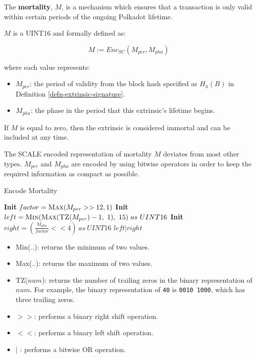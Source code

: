 \begin{definition}
    \label{defn-extrinsic-mortality}
    The \textbf{mortality}, $M$, is a mechanism which ensures that a transaction
    is only valid within certain periods of the ongoing Polkadot lifetime.
    \newline

    $M$ is a UINT16 and formally defined as:

    \[
        M := Enc_{SC}(M_{per}, M_{pha})
    \]

    where each value represents:

    \begin{itemize}
        \item $M_{per}$: the period of validity from the block hash
        specified as $H_h(B)$ in Definition \ref{defn-extrinsic-signature}.
        \item $M_{pha}$: the phase in the period that this extrinsic's lifetime begins.
    \end{itemize}

    If $M$ is equal to zero, then the extrinsic is considered immortal and can
    be included at any time.
    \newline

    The SCALE encoded representation of mortality $M$ deviates from most other
    types. $M_{per}$ and $M_{pha}$ are encoded by using bitwise operators in
    order to keep the required information as compact as possible.

    \begin{algorithm}
        \caption[]{\sc Encode Mortality}
        \label{algo-encode-mortality}
        \begin{algorithmic}[1]
            \State \textbf{Init} $factor = \textsc{Max}(M_{per} >> 12, 1)$
            \State \textbf{Init} $left = \textsc{Min}(\textsc{Max}(\textsc{TZ}(M_{per})-1,\ 1),\ 15)\ as\ UINT16$
            \State \textbf{Init} $right = (\frac{M_{pha}}{factor} << 4)\ as\ UINT16$
            \State \Return $left|right$
        \end{algorithmic}

        \begin{itemize}
            \item {\sc Min(..)}: returns the minimum of two values.
            \item {\sc Max(..)}: returns the maximum of two values.
            \item {\sc TZ($num$)}: returns the number of trailing zeros in the
            binary representation of $num$. For example, the binary
            representation of \verb|40| is \verb|0010 1000|, which has three
            trailing zeros.
            \item $>>$: performs a binary right shift operation.
            \item $<<$: performs a binary left shift operation.
            \item $|$ : performs a bitwise OR operation.
        \end{itemize}
    \end{algorithm}
\end{definition}

